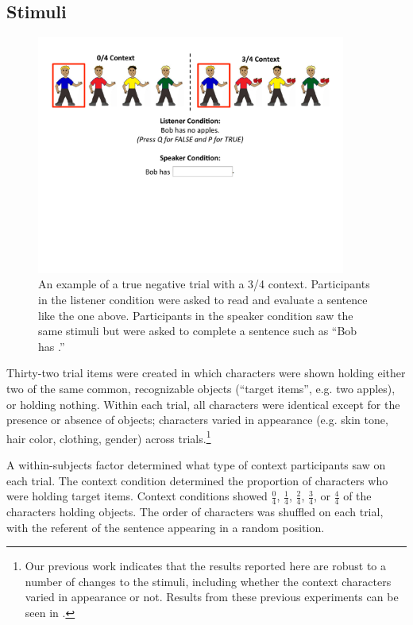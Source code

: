 \documentclass[man]{apa2}
\begin{document}
\subsection{Stimuli}

\begin{figure}[t]
\begin{center} 
\includegraphics[width=4in]{figures/trialfig.pdf}
\caption{\label{fig:trial} An example of a true negative trial with a 3/4 context. Participants in the listener condition were asked to read and evaluate a sentence like the one above.  Participants in the speaker condition saw the same stimuli but were asked to complete a sentence such as ``Bob has  \textunderscore\textunderscore\textunderscore\textunderscore\textunderscore\textunderscore\textunderscore\textunderscore\textunderscore\textunderscore.''}
\vspace{-5mm}
\end{center} 
\end{figure}

Thirty-two trial items were created in which characters were shown holding either two of the same common, recognizable objects (``target items'', e.g. two apples), or holding nothing.  Within each trial, all characters were identical except for the presence or absence of objects; characters varied in appearance (e.g. skin tone, hair color, clothing, gender) across trials.\footnote{Our previous work indicates that the results reported here are robust to a number of changes to the stimuli, including whether the context characters varied in appearance or not.  Results from these previous experiments can be seen in \cite{nordmeyer2014}.}

A within-subjects factor determined what type of context participants saw on each trial.  The context condition determined the proportion of characters who were holding target items.  Context conditions showed $\frac{0}{4}$, $\frac{1}{4}$, $\frac{2}{4}$, $\frac{3}{4}$, or $\frac{4}{4}$ of the characters holding objects. The order of characters was shuffled on each trial, with the referent of the sentence appearing in a random position.  
\end{document}

